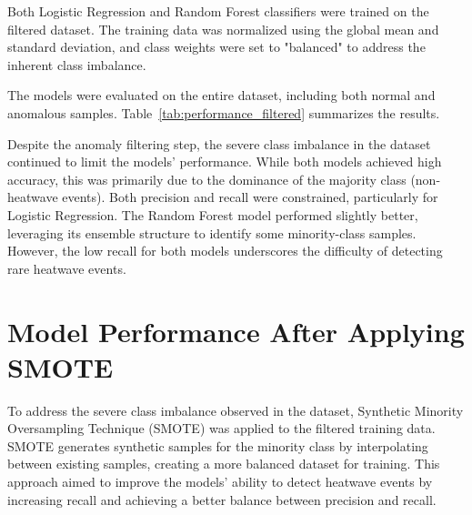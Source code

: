 \documentclass[conference,9pt]{IEEEtran}
\begin{document}
Both Logistic Regression and Random Forest classifiers were trained on the filtered dataset. The training data was normalized using the global mean and standard deviation, and class weights were set to "balanced" to address the inherent class imbalance.

The models were evaluated on the entire dataset, including both normal and anomalous samples. Table~\ref{tab:performance_filtered} summarizes the results.

\begin{table}[h!]
\centering
\caption{Performance Metrics after Anomaly Filtering}
\label{tab:performance_filtered}
\end{table}

Despite the anomaly filtering step, the severe class imbalance in the dataset continued to limit the models' performance. While both models achieved high accuracy, this was primarily due to the dominance of the majority class (non-heatwave events). Both precision and recall were constrained, particularly for Logistic Regression. The Random Forest model performed slightly better, leveraging its ensemble structure to identify some minority-class samples. However, the low recall for both models underscores the difficulty of detecting rare heatwave events.

\section{Model Performance After Applying SMOTE}
To address the severe class imbalance observed in the dataset, Synthetic Minority Oversampling Technique (SMOTE) was applied to the filtered training data. SMOTE generates synthetic samples for the minority class by interpolating between existing samples, creating a more balanced dataset for training. This approach aimed to improve the models' ability to detect heatwave events by increasing recall and achieving a better balance between precision and recall.


\begin{table}[h]
\centering
\caption{Performance Metrics After Applying SMOTE}
\label{tab:performance_smote}
\end{table}
\end{document}
